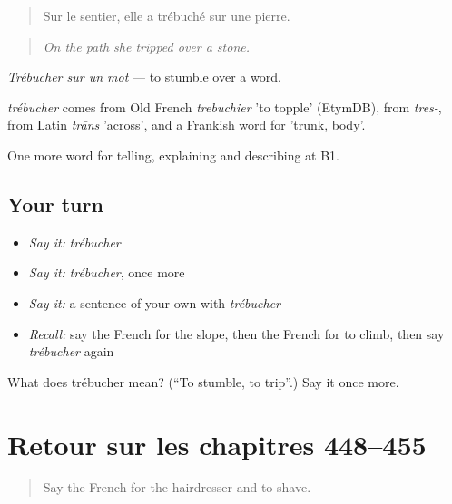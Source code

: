 \begin{quote}
Sur le sentier, elle a trébuché sur une pierre.
\end{quote}

\begin{quote}
\emph{On the path she tripped over a stone.}
\end{quote}

\emph{Trébucher sur un mot} — to stumble over a word.

\begin{cousinweb}
\emph{trébucher} comes from Old French \emph{trebuchier} 'to topple' (EtymDB), from \emph{tres-}, from Latin \emph{trāns} 'across', and a Frankish word for 'trunk, body'.
\end{cousinweb}

\begin{grammarlens}[title={What you've built}]
One more word for telling, explaining and describing at B1.
\end{grammarlens}

\subsection*{Your turn}
\begin{itemize}
\raggedright
  \item \emph{Say it:} \emph{trébucher}
  \item \emph{Say it:} \emph{trébucher}, once more
  \item \emph{Say it:} a sentence of your own with \emph{trébucher}
  \item \emph{Recall:} say the French for the slope, then the French for to climb, then say \emph{trébucher} again
\end{itemize}

\begin{tcolorbox}[breakable,colback=teal!4,colframe=teal!35!black,title={Before you move on}]
What does trébucher mean? (\textquotedblleft{}To stumble, to trip\textquotedblright{}.) Say it once more.
\end{tcolorbox}
\section[(dialogue)]{Retour sur les chapitres 448–455}

\label{lesson:FR-R455-revision-448-455}



\begin{quote}
Say the French for the hairdresser and to shave.
\end{quote}

